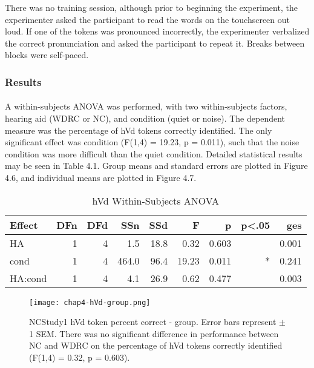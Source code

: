 There was no training session, although prior to beginning the experiment, the experimenter asked the participant to read the words on the touchscreen out loud.  If one of the tokens was pronounced incorrectly, the experimenter verbalized the correct pronunciation and asked the participant to repeat it.  Breaks between blocks were self-paced.
\subsubsection{Results}
\paragraph{}A within-subjects ANOVA was performed, with two within-subjects factors, hearing aid (WDRC or NC), and condition (quiet or noise).  The dependent measure was the percentage of hVd tokens correctly identified.  The only significant effect was condition (F(1,4) = 19.23, p = 0.011), such that the noise condition was more difficult than the quiet condition.  Detailed statistical results may be seen in Table 4.1.  Group means and standard errors are plotted in Figure 4.6, and individual means are plotted in Figure 4.7.

\begin{table}[htp]
\begin{center}
\begin{tabular}{lrrrrrrrr}
       Effect & DFn & DFd  &  SSn &  SSd  &    F  &     p & p<.05  &   ges \\
       \hline
          HA  & 1  & 4 & 1.5 &  18.8 &  0.32 & 0.603   &    & 0.001 \\
        cond  & 1 &  4 & 464.0  &  96.4 & 19.23 & 0.011 &    * & 0.241 \\
     HA:cond  & 1  & 4 & 4.1 &  26.9 &  0.62 & 0.477   &    & 0.003 \\
     \hline
\end{tabular}
\end{center}
\caption{hVd Within-Subjects ANOVA}
\end{table}

\begin{figure}[htp]
\begin{center}
\texttt{[image: chap4-hVd-group.png]} \\
\caption[NCStudy1 hVd token percent correct - group]{NCStudy1 hVd token percent correct - group.  Error bars represent $\pm$ 1 SEM.  There was no significant difference in performance between NC and WDRC on the percentage of hVd tokens correctly identified (F(1,4) = 0.32, p = 0.603).}
\label{ch4-hVd-group}
\end{center}
\end{figure}

